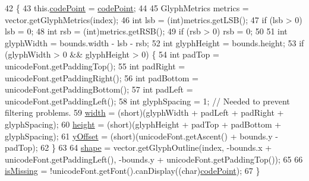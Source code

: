 \begin{DoxyCode}
42                                                                                                           \{
43         this.\mbox{\hyperlink{classorg_1_1newdawn_1_1slick_1_1font_1_1_glyph_a7aea2e2bd765045b2457d58e14052e37}{codePoint}} = \mbox{\hyperlink{classorg_1_1newdawn_1_1slick_1_1font_1_1_glyph_a7aea2e2bd765045b2457d58e14052e37}{codePoint}};
44 
45         GlyphMetrics metrics = vector.getGlyphMetrics(index);
46         \textcolor{keywordtype}{int} lsb = (int)metrics.getLSB();
47         \textcolor{keywordflow}{if} (lsb > 0) lsb = 0;
48         \textcolor{keywordtype}{int} rsb = (int)metrics.getRSB();
49         \textcolor{keywordflow}{if} (rsb > 0) rsb = 0;
50 
51         \textcolor{keywordtype}{int} glyphWidth = bounds.width - lsb - rsb;
52         \textcolor{keywordtype}{int} glyphHeight = bounds.height;
53         \textcolor{keywordflow}{if} (glyphWidth > 0 && glyphHeight > 0) \{
54             \textcolor{keywordtype}{int} padTop = unicodeFont.getPaddingTop();
55             \textcolor{keywordtype}{int} padRight = unicodeFont.getPaddingRight();
56             \textcolor{keywordtype}{int} padBottom = unicodeFont.getPaddingBottom();
57             \textcolor{keywordtype}{int} padLeft = unicodeFont.getPaddingLeft();
58             \textcolor{keywordtype}{int} glyphSpacing = 1; \textcolor{comment}{// Needed to prevent filtering problems.}
59             \mbox{\hyperlink{classorg_1_1newdawn_1_1slick_1_1font_1_1_glyph_a3607f8f4c231c2f6cb6d212019d050f6}{width}} = (short)(glyphWidth + padLeft + padRight + glyphSpacing);
60             \mbox{\hyperlink{classorg_1_1newdawn_1_1slick_1_1font_1_1_glyph_a43d234609f29c664ecbc31f452ba3367}{height}} = (short)(glyphHeight + padTop + padBottom + glyphSpacing);
61             \mbox{\hyperlink{classorg_1_1newdawn_1_1slick_1_1font_1_1_glyph_ae04dea0b41cbbcd6b10c7f70a8c704f8}{yOffset}} = (short)(unicodeFont.getAscent() + bounds.y - padTop);
62         \}
63 
64         \mbox{\hyperlink{classorg_1_1newdawn_1_1slick_1_1font_1_1_glyph_a128faa13d2bf71ee4ce3cd3a77e7682f}{shape}} = vector.getGlyphOutline(index, -bounds.x + unicodeFont.getPaddingLeft(), -bounds.y + 
      unicodeFont.getPaddingTop());
65 
66         \mbox{\hyperlink{classorg_1_1newdawn_1_1slick_1_1font_1_1_glyph_a2d0b164910c22c995b6cd62ed2f025cf}{isMissing}} = !unicodeFont.getFont().canDisplay((\textcolor{keywordtype}{char})\mbox{\hyperlink{classorg_1_1newdawn_1_1slick_1_1font_1_1_glyph_a7aea2e2bd765045b2457d58e14052e37}{codePoint}});
67     \}
\end{DoxyCode}


